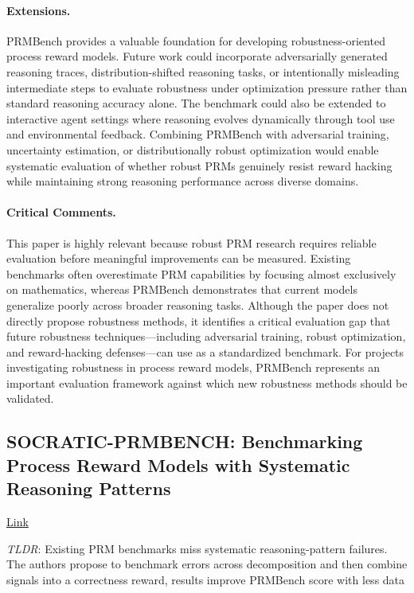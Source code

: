 \documentclass[11pt]{article}
\begin{document}
\paragraph{Extensions.}
PRMBench provides a valuable foundation for developing robustness-oriented process reward models. Future work could incorporate adversarially generated reasoning traces, distribution-shifted reasoning tasks, or intentionally misleading intermediate steps to evaluate robustness under optimization pressure rather than standard reasoning accuracy alone. The benchmark could also be extended to interactive agent settings where reasoning evolves dynamically through tool use and environmental feedback. Combining PRMBench with adversarial training, uncertainty estimation, or distributionally robust optimization would enable systematic evaluation of whether robust PRMs genuinely resist reward hacking while maintaining strong reasoning performance across diverse domains.

\paragraph{Critical Comments.}
This paper is highly relevant because robust PRM research requires reliable evaluation before meaningful improvements can be measured. Existing benchmarks often overestimate PRM capabilities by focusing almost exclusively on mathematics, whereas PRMBench demonstrates that current models generalize poorly across broader reasoning tasks. Although the paper does not directly propose robustness methods, it identifies a critical evaluation gap that future robustness techniques—including adversarial training, robust optimization, and reward-hacking defenses—can use as a standardized benchmark. For projects investigating robustness in process reward models, PRMBench represents an important evaluation framework against which new robustness methods should be validated.

\subsection{SOCRATIC-PRMBENCH: Benchmarking Process Reward Models with Systematic Reasoning Patterns}

\href{https://arxiv.org/abs/2505.23474}{Link}

\emph{TLDR}: Existing PRM benchmarks miss systematic reasoning-pattern failures. The authors propose to benchmark errors across decomposition and then combine signals into a correctness reward, results improve PRMBench score with less data
\end{document}
